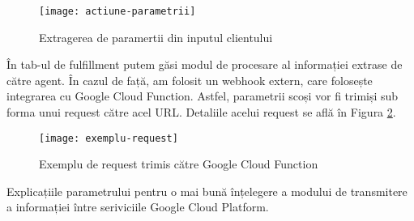 \begin{figure}[h]
    \centering
    \texttt{[image: actiune-parametrii]}
    \caption{Extragerea de paramertii din inputul clientului}
    \label{fig:actiune-parametrii}
\end{figure}

În tab-ul de fulfillment putem găsi modul de procesare al informației extrase de către agent. În cazul de față, am folosit un webhook extern, care folosește integrarea cu Google Cloud Function. Astfel, parametrii scoși vor fi trimiși sub forma unui request către acel URL. Detaliile acelui request se află în Figura \ref{fig:exemplu-request}.

\begin{figure}[h]
    \centering
    \texttt{[image: exemplu-request]}
    \caption{Exemplu de request trimis către Google Cloud Function}
    \label{fig:exemplu-request}
\end{figure}

Explicațiile parametrului pentru o mai bună înțelegere a modului de transmitere a informației între seriviciile Google Cloud Platform.

